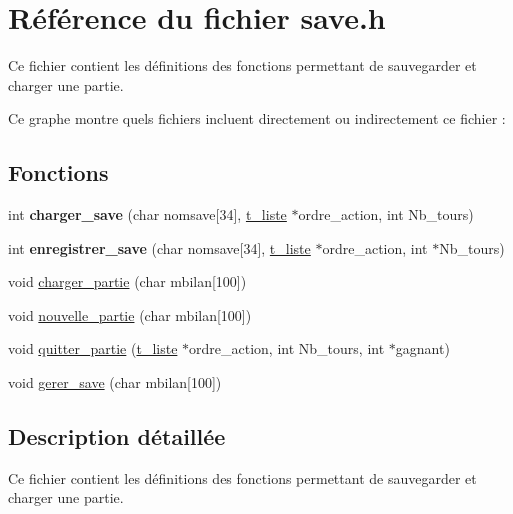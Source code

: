 \hypertarget{a00030}{}\section{Référence du fichier save.\+h}
\label{a00030}


Ce fichier contient les définitions des fonctions permettant de sauvegarder et charger une partie.  


Ce graphe montre quels fichiers incluent directement ou indirectement ce fichier \+:
\subsection*{Fonctions}
\begin{DoxyCompactItemize}
\item 
int {\bfseries charger\+\_\+save} (char nomsave\mbox{[}34\mbox{]}, \hyperlink{a00007}{t\+\_\+liste} $\ast$ordre\+\_\+action, int Nb\+\_\+tours)\hypertarget{a00030_a01e568d0435d25ea27ddc9b9b94e4522}{}\label{a00030_a01e568d0435d25ea27ddc9b9b94e4522}

\item 
int {\bfseries enregistrer\+\_\+save} (char nomsave\mbox{[}34\mbox{]}, \hyperlink{a00007}{t\+\_\+liste} $\ast$ordre\+\_\+action, int $\ast$Nb\+\_\+tours)\hypertarget{a00030_ad3ae5a37a3aac10cd918e479c585fa98}{}\label{a00030_ad3ae5a37a3aac10cd918e479c585fa98}

\item 
void \hyperlink{a00030_a3432d62256256cc6e1bef17a4eaff1c7}{charger\+\_\+partie} (char mbilan\mbox{[}100\mbox{]})
\item 
void \hyperlink{a00030_a9081f16cfa0bd92678bdcffad6456630}{nouvelle\+\_\+partie} (char mbilan\mbox{[}100\mbox{]})
\item 
void \hyperlink{a00030_a6578c42b3ced64d7ebcb4c94acee1410}{quitter\+\_\+partie} (\hyperlink{a00007}{t\+\_\+liste} $\ast$ordre\+\_\+action, int Nb\+\_\+tours, int $\ast$gagnant)
\item 
void \hyperlink{a00030_ad2efcf23a5a818ea578447b2e2997315}{gerer\+\_\+save} (char mbilan\mbox{[}100\mbox{]})
\end{DoxyCompactItemize}


\subsection{Description détaillée}
Ce fichier contient les définitions des fonctions permettant de sauvegarder et charger une partie. 

